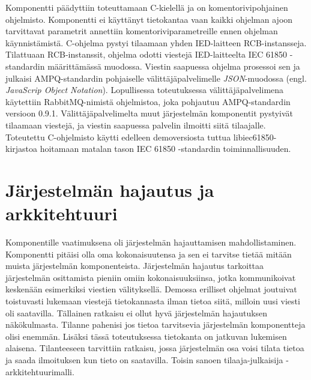 Komponentti päädyttiin toteuttamaan C-kielellä ja on komentorivipohjainen ohjelmisto. Komponentti ei käyttänyt tietokantaa vaan kaikki ohjelman ajoon tarvittavat parametrit annettiin komentoriviparametreille ennen ohjelman käynnistämistä. C-ohjelma pystyi tilaamaan yhden IED-laitteen RCB-instansseja. Tilattuaan RCB-instanssit, ohjelma odotti viestejä IED-laitteelta IEC 61850 -standardin määrittämässä muodossa. Viestin saapuessa ohjelma prosessoi sen ja julkaisi AMPQ-standardin pohjaiselle välittäjäpalvelimelle \emph{JSON}-muodossa (engl. \emph{JavaScrip Object Notation}). Lopullisessa toteutuksessa välittäjäpalvelimena käytettiin RabbitMQ-nimistä ohjelmistoa, joka pohjautuu AMPQ-standardin versioon 0.9.1. Välittäjäpalvelimelta muut järjestelmän komponentit pystyivät tilaamaan viestejä, ja viestin saapuessa palvelin ilmoitti siitä tilaajalle. Toteutettu C-ohjelmisto käytti edelleen demoversiosta tuttua libiec61850-kirjastoa hoitamaan matalan tason IEC 61850 -standardin toiminnallisuuden.


\section{Järjestelmän hajautus ja arkkitehtuuri}
\label{ch:järjestelmän-hajautus-ja-arkkitehtuuri}
Komponentille vaatimuksena oli järjestelmän hajauttamisen mahdollistaminen. Komponentti pitäisi olla oma kokonaisuutensa ja sen ei tarvitse tietää mitään muista järjestelmän komponenteista.  Järjestelmän hajautus tarkoittaa järjestelmän osittamista pieniin omiin kokonaisuuksiinsa, jotka kommunikoivat keskenään esimerkiksi viestien välityksellä. Demossa erilliset ohjelmat joutuivat toistuvasti lukemaan viestejä tietokannasta ilman tietoa siitä, milloin uusi viesti oli saatavilla. Tällainen ratkaisu ei ollut hyvä järjestelmän hajautuksen näkökulmasta. Tilanne pahenisi jos tietoa tarvitsevia järjestelmän komponentteja olisi enemmän. Lisäksi tässä toteutuksessa tietokanta on jatkuvan lukemisen alaisena. Tilanteeseen tarvittiin ratkaisu, jossa järjestelmän osa voisi tilata tietoa ja saada ilmoituksen kun tieto on saatavilla. Toisin sanoen tilaaja-julkaisija -arkkitehtuurimalli.

